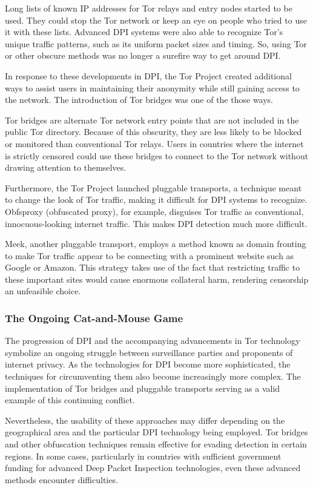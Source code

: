 \documentclass[12pt, fleqn, a4paper]{article}
\begin{document}
Long lists of known IP addresses for Tor relays and entry nodes started to be used. They could stop the Tor network or keep an eye on people who tried to use it with these lists. Advanced DPI systems were also able to recognize Tor's unique traffic patterns, such as its uniform packet sizes and timing. So, using Tor or other obscure methods was no longer a surefire way to get around DPI.\citep{torblocking}

In response to these developments in DPI, the Tor Project created additional ways to assist users in maintaining their anonymity while still gaining access to the network. The introduction of Tor bridges was one of the those ways.

Tor bridges are alternate Tor network entry points that are not included in the public Tor directory. Because of this obscurity, they are less likely to be blocked or monitored than conventional Tor relays. Users in countries where the internet is strictly censored could use these bridges to connect to the Tor network without drawing attention to themselves.

Furthermore, the Tor Project launched pluggable transports, a technique meant to change the look of Tor traffic, making it difficult for DPI systems to recognize. Obfsproxy (obfuscated proxy), for example, disguises Tor traffic as conventional, innocuous-looking internet traffic. This makes DPI detection much more difficult. \citep{bridges}

Meek, another pluggable transport, employs a method known as domain fronting to make Tor traffic appear to be connecting with a prominent website such as Google or Amazon. This strategy takes use of the fact that restricting traffic to these important sites would cause enormous collateral harm, rendering censorship an unfeasible choice. \citep{domainfronting}

\subsubsection{The Ongoing Cat-and-Mouse Game}
The progression of DPI and the accompanying advancements in Tor technology symbolize an ongoing struggle between surveillance parties and proponents of internet privacy. As the technologies for DPI become more sophisticated, the techniques for circumventing them also become increasingly more complex. The implementation of Tor bridges and pluggable transports serving as a valid example of this continuing conflict.

Nevertheless, the usability of these approaches may differ depending on the geographical area and the particular DPI technology being employed. Tor bridges and other obfuscation techniques remain effective for evading detection in certain regions. In some cases, particularly in countries with sufficient government funding for advanced Deep Packet Inspection  technologies, even these advanced methods encounter difficulties. \citep{chinator}
\end{document}

